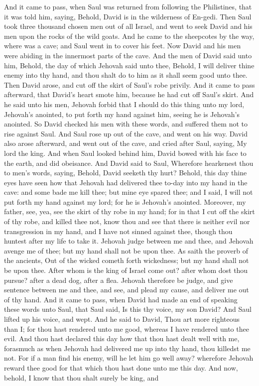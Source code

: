 And it came to pass, when Saul was returned from following the Philistines, that it was told him, saying, Behold, David is in the wilderness of En-gedi. Then Saul took three thousand chosen men out of all Israel, and went to seek David and his men upon the rocks of the wild goats. And he came to the sheepcotes by the way, where was a cave; and Saul went in to cover his feet. Now David and his men were abiding in the innermost parts of the cave. And the men of David said unto him, Behold, the day of which Jehovah said unto thee, Behold, I will deliver thine enemy into thy hand, and thou shalt do to him as it shall seem good unto thee. Then David arose, and cut off the skirt of Saul’s robe privily. And it came to pass afterward, that David’s heart smote him, because he had cut off Saul’s skirt. And he said unto his men, Jehovah forbid that I should do this thing unto my lord, Jehovah’s anointed, to put forth my hand against him, seeing he is Jehovah’s anointed. So David checked his men with these words, and suffered them not to rise against Saul. And Saul rose up out of the cave, and went on his way.  David also arose afterward, and went out of the cave, and cried after Saul, saying, My lord the king. And when Saul looked behind him, David bowed with his face to the earth, and did obeisance. And David said to Saul, Wherefore hearkenest thou to men’s words, saying, Behold, David seeketh thy hurt? Behold, this day thine eyes have seen how that Jehovah had delivered thee to-day into my hand in the cave: and some bade me kill thee; but mine eye spared thee; and I said, I will not put forth my hand against my lord; for he is Jehovah’s anointed. Moreover, my father, see, yea, see the skirt of thy robe in my hand; for in that I cut off the skirt of thy robe, and killed thee not, know thou and see that there is neither evil nor transgression in my hand, and I have not sinned against thee, though thou huntest after my life to take it. Jehovah judge between me and thee, and Jehovah avenge me of thee; but my hand shall not be upon thee. As saith the proverb of the ancients, Out of the wicked cometh forth wickedness; but my hand shall not be upon thee. After whom is the king of Israel come out? after whom dost thou pursue? after a dead dog, after a flea. Jehovah therefore be judge, and give sentence between me and thee, and see, and plead my cause, and deliver me out of thy hand.  And it came to pass, when David had made an end of speaking these words unto Saul, that Saul said, Is this thy voice, my son David? And Saul lifted up his voice, and wept. And he said to David, Thou art more righteous than I; for thou hast rendered unto me good, whereas I have rendered unto thee evil. And thou hast declared this day how that thou hast dealt well with me, forasmuch as when Jehovah had delivered me up into thy hand, thou killedst me not. For if a man find his enemy, will he let him go well away? wherefore Jehovah reward thee good for that which thou hast done unto me this day. And now, behold, I know that thou shalt surely be king, and 